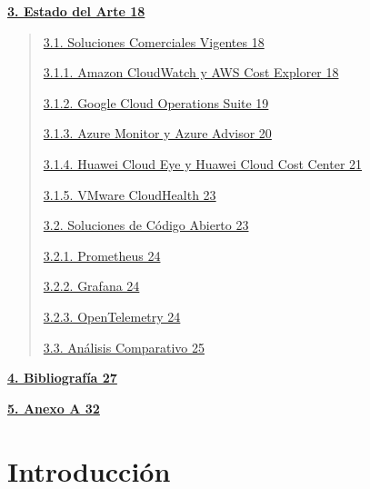 \documentclass[
]{article}
\begin{document}
\hyperref[estado-del-arte]{\textbf{3. Estado del Arte 18}}

\begin{quote}
\hyperref[soluciones-comerciales-vigentes]{3.1. Soluciones Comerciales
Vigentes 18}

\hyperref[amazon-cloudwatch-y-aws-cost-explorer]{3.1.1. Amazon
CloudWatch y AWS Cost Explorer 18}

\hyperref[google-cloud-operations-suite]{3.1.2. Google Cloud Operations
Suite 19}

\hyperref[azure-monitor-y-azure-advisor]{3.1.3. Azure Monitor y Azure
Advisor 20}

\hyperref[huawei-cloud-eye-y-huawei-cloud-cost-center]{3.1.4. Huawei
Cloud Eye y Huawei Cloud Cost Center 21}

\hyperref[vmware-cloudhealth]{3.1.5. VMware CloudHealth 23}

\hyperref[soluciones-de-cuxf3digo-abierto]{3.2. Soluciones de Código
Abierto 23}

\hyperref[prometheus]{3.2.1. Prometheus 24}

\hyperref[grafana]{3.2.2. Grafana 24}

\hyperref[opentelemetry]{3.2.3. OpenTelemetry 24}

\hyperref[anuxe1lisis-comparativo]{3.3. Análisis Comparativo 25}
\end{quote}

\hyperref[bibliografuxeda]{\textbf{4. Bibliografía 27}}

\hyperref[anexo-a]{\textbf{5. Anexo A 32}}

\section{Introducción}\label{introducciuxf3n}
\end{document}
